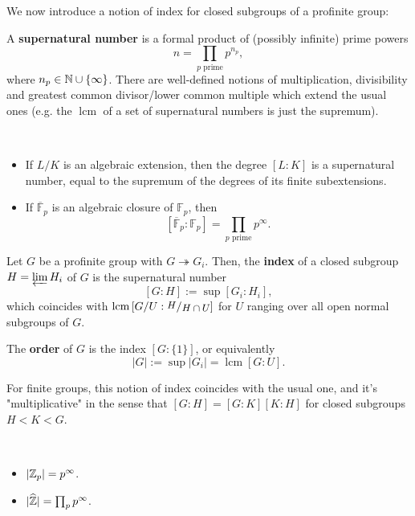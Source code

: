 \documentclass[a4paper, oneside]{memoir}
\begin{document}
We now introduce a notion of index for closed subgroups of a profinite group:

\begin{definition}
	A \textbf{supernatural number} is a formal product of (possibly infinite) prime powers
	\[
		n=\prod_{p\text{ prime}}{p^{n_p}},
	\]
	where $n_p\in\mathbb{N}\cup\{\infty\}$. There are well-defined notions of multiplication, divisibility and greatest common divisor/lower common multiple which extend the usual ones (e.g. the $\operatorname{lcm}$ of a set of supernatural numbers is just the supremum).
\end{definition}

\begin{example}\
	\begin{itemize}
		\item If $L/K$ is an algebraic extension, then the degree $[L:K]$ is a supernatural number, equal to the supremum of the degrees of its finite subextensions.
		\item If $\overline{\mathbb{F}}_p$ is an algebraic closure of $\mathbb{F}_p$, then
		      \[
			      [\overline{\mathbb{F}}_p:\mathbb{F}_p] =  \prod_{p\text{ prime}}{p^{\infty}}.
		      \]
	\end{itemize}
\end{example}

\begin{definition}
	Let $G$ be a profinite group with $G \twoheadrightarrow G_i$. Then, the \textbf{index} of a closed subgroup $H=\varprojlim{H_i}$ of $G$ is the supernatural number
	\[
		[G:H]:=\sup[G_i:H_i],
	\] which coincides with $\operatorname{lcm}{[G/U : \sfrac{H}{H\cap U}]}$ for $U$ ranging over all open normal subgroups of $G$.

	The \textbf{order} of $G$ is the index $[G:\{1\}]$, or equivalently
	\[
		|G|:=\sup|G_i|= \operatorname{lcm}{[G:U]}.
	\]
\end{definition}

For finite groups, this notion of index coincides with the usual one, and it's "multiplicative" in the sense that $[G:H]=[G:K][K:H]$ for closed subgroups $H<K<G$.

\begin{example}\
	\begin{itemize}
		\item $|\mathbb{Z}_p| = p^{\infty}$.
		\item $|\widehat{\mathbb{Z}}| = \prod_{p}{p^{\infty}}$.
	\end{itemize}
\end{example}
\end{document}
